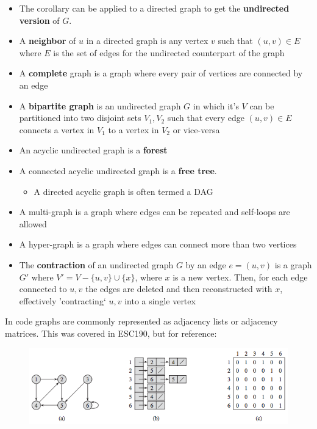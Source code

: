 \documentclass[../notes.tex]{subfiles}
\begin{document}
\begin{itemize}
	\item The corollary can be applied to a directed graph to get the \textbf{undirected version} of $ G $.
	\item A \textbf{neighbor} of $ u $ in a directed graph is any vertex $ v $ such that $ (u,v) \in E $ where $ E $ is the set of edges for the undirected counterpart of the graph
	\item A \textbf{complete} graph is a graph where every pair of vertices are connected by an edge
	\item A \textbf{bipartite graph} is an undirected graph $ G $  in which it's $ V $ can be partitioned into two disjoint sets $ V_1, V_2 $ such that every edge $ (u,v) \in E $ connects a vertex in $ V_1 $ to a vertex in $ V_2 $ or vice-versa
	\item An acyclic undirected graph is a \textbf{forest}
	\item A connected acyclic undirected graph is a \textbf{free tree}. 
		\begin{itemize}
			\item A directed acyclic graph is often termed a DAG
		\end{itemize}
	\item A multi-graph is a graph where edges can be repeated and self-loops are allowed
	\item A hyper-graph is a graph where edges can connect more than two vertices
	\item The \textbf{contraction} of an undirected graph $ G $ by an edge $ e = (u,v) $ is a graph $ G' $  where $ V' = V - \{u,v\} \cup \{x\} $, where $ x $ is a new vertex. Then, for each edge connected to $ u, v$ the edges are deleted and then reconstructed with $ x $, effectively 'contracting` $ u ,v $  into a single vertex
\end{itemize}

In code graphs are commonly represented as adjacency lists or adjacency matrices. 
This was covered in ESC190, but for reference:

\begin{figure}[H]
	\centering
	\includegraphics[width=0.8\linewidth]{img/image_2022-09-22-00-29-19.png}
\end{figure}
\end{document}
